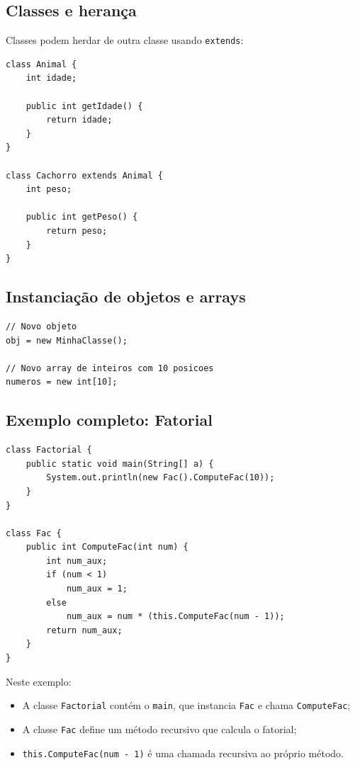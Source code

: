 \documentclass[a4paper, 12pt]{article}
\begin{document}
\subsection{Classes e heran\c{c}a}

Classes podem herdar de outra classe usando \texttt{extends}:

\begin{lstlisting}[style=minijava, caption={Heran\c{c}a de classes}]
class Animal {
    int idade;

    public int getIdade() {
        return idade;
    }
}

class Cachorro extends Animal {
    int peso;

    public int getPeso() {
        return peso;
    }
}
\end{lstlisting}

\subsection{Instancia\c{c}\~ao de objetos e arrays}

\begin{lstlisting}[style=minijava, caption={Cria\c{c}\~ao de objetos e arrays}]
// Novo objeto
obj = new MinhaClasse();

// Novo array de inteiros com 10 posicoes
numeros = new int[10];
\end{lstlisting}

\subsection{Exemplo completo: Fatorial}

\begin{lstlisting}[style=minijava, caption={Programa que calcula o fatorial de 10}]
class Factorial {
    public static void main(String[] a) {
        System.out.println(new Fac().ComputeFac(10));
    }
}

class Fac {
    public int ComputeFac(int num) {
        int num_aux;
        if (num < 1)
            num_aux = 1;
        else
            num_aux = num * (this.ComputeFac(num - 1));
        return num_aux;
    }
}
\end{lstlisting}

Neste exemplo:
\begin{itemize}
    \item A classe \texttt{Factorial} cont\'em o \texttt{main}, que instancia \texttt{Fac} e chama \texttt{ComputeFac};
    \item A classe \texttt{Fac} define um m\'etodo recursivo que calcula o fatorial;
    \item \texttt{this.ComputeFac(num - 1)} \'e uma chamada recursiva ao pr\'oprio m\'etodo.
\end{itemize}
\end{document}
